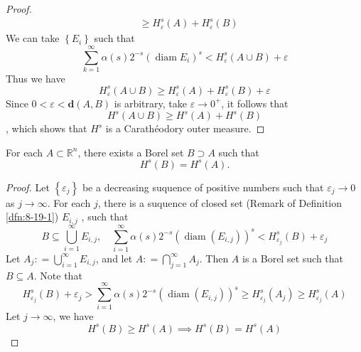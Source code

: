 \documentclass[../main.tex]{subfiles}
\begin{document}
\begin{proof}
\[\begin{aligned}
     &\ge H_{ \varepsilon }^{s}\left( A \right)+ H_{ \varepsilon }^{s}\left( B \right)  
   \end{aligned}
    \]  We can take \(  \left\{ E_{i} \right\}  \) such that \[
    \sum _{k = 1}^{\infty}\alpha \left( s \right)2^{-s}\left( \operatorname{diam}E_{i} \right)^{s}< H_{ \varepsilon }^{s}\left( A\cup B \right)   +  \varepsilon 
    \]     Thus we have \[
    H_{ \varepsilon }^{s}\left( A\cup B \right)\ge H_{ \varepsilon }^{s}\left( A \right)+ H_{ \varepsilon }^{s}\left( B \right)+  \varepsilon    
    \]Since \(  0<  \varepsilon < \mathbf{d}\left( A,B \right)   \) is arbitrary, take \(   \varepsilon \to 0^{+ }  \), it follows that \[
    H^{s}\left( A\cup B \right)\ge H^{s}\left( A \right)+ H^{s}\left( B \right)   
    \], which shows that \(  H^{s}  \) is a Carathéodory outer measure.      
\end{proof}

\begin{theorem}{}{}
For each $A \subset \mathbb{R}^n$, there exists a Borel set $B \supset A$ such that
\[H^s(B) = H^s(A).\]
\end{theorem}

\begin{proof}
    Let \(  \left\{  \varepsilon _{j} \right\}  \) be a decreasing suquence of positive numbers such that \(   \varepsilon _{j}\to 0   \) as \(  j\to \infty  \). For each \(  j  \), there is a suquence of closed set (Remark of Definition \ref{dfn:8-19-1}) \(  E_{i,j}  \) , such that \[
    B\subseteq \bigcup _{i= 1}^{\infty}E_{i,j},\quad \sum _{i= 1}^{\infty}\alpha \left( s \right)2^{-s} \left( \operatorname{diam}\left( E_{i,j} \right)  \right)^{s}<  H_{ \varepsilon_{j} }^{s}\left( B \right)+  \varepsilon _{j}   
    \] Let \(  A_{j}: = \bigcup _{i = 1}^{\infty}E_{i,j}  \), and let \(  A: = \bigcap_{j= 1}^{\infty}A_{j}   \). Then   \(  A  \) is a Borel set such that \(  B\subseteq A  \). Note that \[
    H_{ \varepsilon _{j}}^{s}\left( B \right)+  \varepsilon _{j}>  \sum _{i = 1}^{\infty} \alpha \left( s \right)2^{-s}\left( \operatorname{diam}\left( E_{i,j} \right)  \right)^{s}\ge H_{ \varepsilon _{j}}^{s}\left( A_{j} \right)\ge  H_{ \varepsilon _{j}}^{s} \left( A \right) 
    \]    Let \(  j\to \infty  \), we have \[
    H^{s}\left( B \right)\ge H^{s}\left( A \right)  \implies H^{s}\left( B \right)= H^{s}\left( A \right)  
    \] 
\end{proof}
\end{document}
